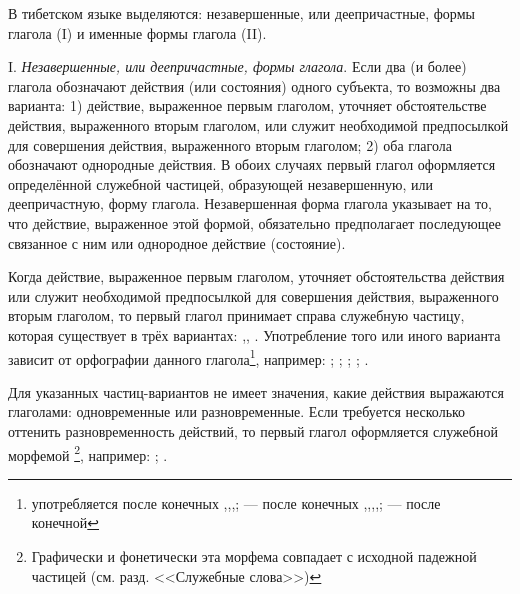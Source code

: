 В тибетском языке выделяются: незавершенные, или деепричастные, формы глагола (I) и именные формы глагола (II).

I. \emph{Незавершенные, или деепричастные, формы глагола}. Если два (и более) глагола обозначают действия (или состояния) одного субъекта, то возможны два варианта: 1) действие, выраженное первым глаголом, уточняет обстоятельстве действия, выраженного вторым глаголом, или служит необходимой предпосылкой для совершения действия, выраженного вторым глаголом; 2) оба глагола обозначают однородные действия. В обоих случаях первый глагол оформляется определённой служебной частицей, образующей незавершенную, или деепричастную, форму глагола. Незавершенная форма глагола указывает на то, что действие, выраженное этой формой, обязательно предполагает последующее связанное с ним или однородное действие (состояние).

Когда действие, выраженное первым глаголом, уточняет обстоятельства действия или служит необходимой предпосылкой для совершения действия, выраженного вторым глаголом, то первый глагол принимает справа служебную частицу, которая существует в трёх вариантах: ,, . Употребление того или иного варианта зависит от орфографии данного глагола\footnote[36]{ употребляется после конечных ,,,;  --- после конечных ,,,,;  --- после конечной }, например:
;
;
;
;
.

Для указанных частиц-вариантов не имеет значения, какие действия выражаются глаголами: одновременные или разновременные. Если требуется несколько оттенить разновременность действий, то первый глагол оформляется служебной морфемой \footnote[37]{Графически и фонетически эта морфема совпадает с исходной падежной частицей (см. разд. <<Служебные слова>>)}, например:
;
.

